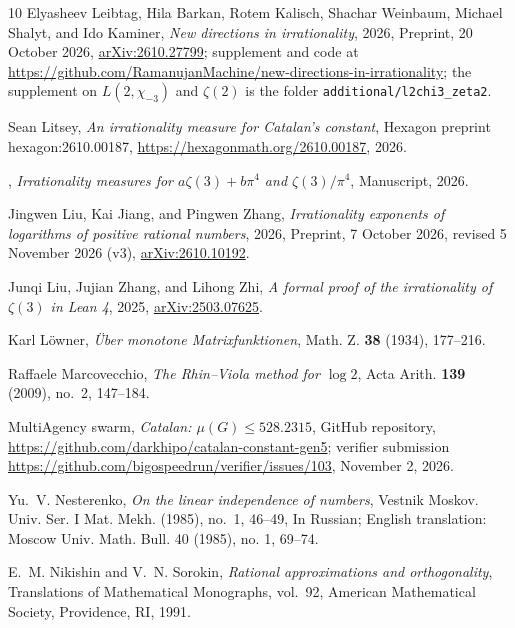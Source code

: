 \documentclass[11pt]{amsart}
\theoremstyle{definition}
\theoremstyle{remark}
\numberwithin{equation}{section}
\begin{document}
\begin{thebibliography}{10}
Elyasheev Leibtag, Hila Barkan, Rotem Kalisch, Shachar Weinbaum, Michael
  Shalyt, and Ido Kaminer, \emph{New directions in irrationality}, 2026,
  Preprint, 20 October 2026,
  \href{https://arxiv.org/abs/2610.27799}{arXiv:2610.27799}; supplement and
  code at
  \url{https://github.com/RamanujanMachine/new-directions-in-irrationality};
  the supplement on {$L(2,\chi_{-3})$} and {$\zeta(2)$} is the folder
  \texttt{additional/l2chi3\_zeta2}.

Sean Litsey, \emph{An irrationality measure for {C}atalan's constant}, Hexagon
  preprint hexagon:2610.00187, \url{https://hexagonmath.org/2610.00187}, 2026.

\bysame, \emph{Irrationality measures for {$a\zeta(3)+b\pi^4$} and
  {$\zeta(3)/\pi^4$}}, Manuscript, 2026.

Jingwen Liu, Kai Jiang, and Pingwen Zhang, \emph{Irrationality exponents of
  logarithms of positive rational numbers}, 2026, Preprint, 7 October 2026,
  revised 5 November 2026 (v3),
  \href{https://arxiv.org/abs/2610.10192}{arXiv:2610.10192}.

Junqi Liu, Jujian Zhang, and Lihong Zhi, \emph{A formal proof of the
  irrationality of {$\zeta(3)$} in {L}ean 4}, 2025,
  \href{https://arxiv.org/abs/2503.07625}{arXiv:2503.07625}.

Karl L\"owner, \emph{\"{U}ber monotone {M}atrixfunktionen}, Math. Z.
  \textbf{38} (1934), 177--216.

Raffaele Marcovecchio, \emph{The {R}hin--{V}iola method for {$\log 2$}}, Acta
  Arith. \textbf{139} (2009), no.~2, 147--184.

{MultiAgency swarm}, \emph{Catalan: {$\mu(G)\le528.2315$}}, GitHub repository,
  \url{https://github.com/darkhipo/catalan-constant-gen5}; verifier submission
  \url{https://github.com/bigospeedrun/verifier/issues/103}, November 2, 2026.

Yu.~V. Nesterenko, \emph{On the linear independence of numbers}, Vestnik
  Moskov. Univ. Ser. I Mat. Mekh. (1985), no.~1, 46--49, In Russian; English
  translation: Moscow Univ. Math. Bull. 40 (1985), no. 1, 69--74.

E.~M. Nikishin and V.~N. Sorokin, \emph{Rational approximations and
  orthogonality}, Translations of Mathematical Monographs, vol.~92, American
  Mathematical Society, Providence, RI, 1991.


\end{thebibliography}
\end{document}
